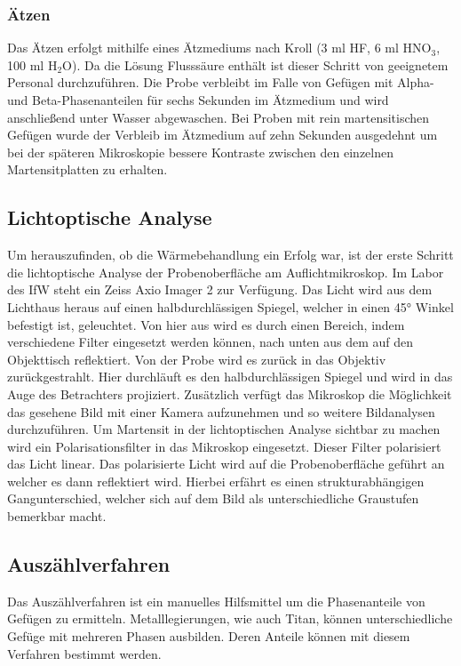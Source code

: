 \documentclass[a4paper, 11pt]{tubsreprt}
\begin{document}
\subsubsection{Ätzen}
Das Ätzen erfolgt mithilfe eines Ätzmediums nach Kroll (3 ml HF, 6 ml HNO$_{3}$, 100 ml H$_{2}$O). Da die Lösung Flusssäure enthält ist dieser Schritt von geeignetem Personal durchzuführen. Die Probe verbleibt im Falle von Gefügen mit Alpha- und Beta-Phasenanteilen für sechs Sekunden im Ätzmedium und wird anschließend unter Wasser abgewaschen. Bei Proben mit rein martensitischen Gefügen wurde der Verbleib im Ätzmedium auf zehn Sekunden ausgedehnt um bei der späteren Mikroskopie bessere Kontraste zwischen den einzelnen Martensitplatten zu erhalten.

\subsection{Lichtoptische Analyse}

Um herauszufinden, ob die Wärmebehandlung ein Erfolg war, ist der erste Schritt die lichtoptische Analyse der Probenoberfläche am Auflichtmikroskop. Im Labor des IfW steht ein Zeiss Axio Imager 2 zur Verfügung. Das Licht wird aus dem Lichthaus heraus auf einen halbdurchlässigen Spiegel, welcher in einen 45° Winkel befestigt ist, geleuchtet. Von hier aus wird es durch einen Bereich, indem verschiedene Filter eingesetzt werden können, nach unten aus dem auf den Objekttisch reflektiert. Von der Probe wird es zurück in das Objektiv zurückgestrahlt. Hier durchläuft es den halbdurchlässigen Spiegel und wird in das Auge des Betrachters projiziert. 
Zusätzlich verfügt das Mikroskop die Möglichkeit das gesehene Bild mit einer Kamera aufzunehmen und so weitere Bildanalysen durchzuführen. 
Um Martensit in der lichtoptischen Analyse sichtbar zu machen wird ein Polarisationsfilter in das Mikroskop eingesetzt. Dieser Filter polarisiert das Licht linear. Das polarisierte Licht wird auf die Probenoberfläche geführt an welcher es dann reflektiert wird. Hierbei erfährt es einen strukturabhängigen Gangunterschied, welcher sich auf dem Bild als unterschiedliche Graustufen bemerkbar macht.

\subsection{Auszählverfahren} \label{Kapitel Auszählverfahren}
Das Auszählverfahren ist ein manuelles Hilfsmittel um die Phasenanteile von Gefügen zu ermitteln. Metalllegierungen, wie auch Titan, können unterschiedliche Gefüge mit mehreren Phasen ausbilden. Deren Anteile können mit diesem Verfahren bestimmt werden.
\end{document}
